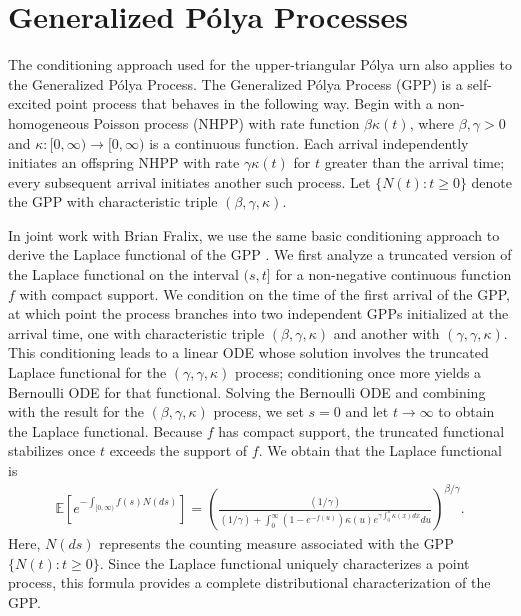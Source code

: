 \documentclass[11pt]{article}
\newenvironment{changemargin}[2]{%
\begin{list}{}{%
\setlength{\topsep}{0pt}%
\setlength{\leftmargin}{#1}%
\setlength{\rightmargin}{#2}%
\setlength{\listparindent}{\parindent}%
\setlength{\itemindent}{\parindent}%
\setlength{\parsep}{\parskip}%
}%
\item[]}{\end{list}}
\begin{document}
\begin{changemargin}{-0.5cm}{-0.5cm}
\section*{Generalized P\'{o}lya Processes}
The conditioning approach used for the upper-triangular Pólya urn also applies to the Generalized Pólya Process. The Generalized P\'{o}lya Process (GPP) is a self-excited point process that behaves in the following way. Begin with a non-homogeneous Poisson process (NHPP) with rate function $\beta \kappa(t)$, where $\beta, \gamma  > 0$ and $\kappa:[0,\infty) \to [0,\infty)$ is a continuous function. Each arrival independently initiates an offspring NHPP with rate $\gamma\kappa(t)$ for $t$ greater than the arrival time; every subsequent arrival initiates another such process.
Let $\{N(t): t \ge 0\}$ denote the GPP with characteristic triple $(\beta, \gamma ,\kappa)$. 

In joint work with Brian Fralix, we use the same basic conditioning approach to derive the Laplace functional of the GPP \cite{PittmanFralix2026GPP}. We first analyze a truncated version of the Laplace functional on the interval $(s,t]$ for a non-negative continuous function $f$ with compact support. We condition on the time of the first arrival of the GPP, at which point the process branches into two independent GPPs initialized at the arrival time, one with characteristic triple $(\beta, \gamma, \kappa)$ and another with $(\gamma, \gamma,\kappa)$.
This conditioning leads to a linear ODE whose solution involves the truncated Laplace functional for the \((\gamma,\gamma,\kappa)\) process; conditioning once more yields a Bernoulli ODE for that functional.
Solving the Bernoulli ODE and combining with the result for the $(\beta, \gamma, \kappa)$ process, we set $s=0$ and let $t\to\infty$ to obtain the Laplace functional. Because $f$ has compact support, the truncated functional stabilizes once $t$ exceeds the support of $f$. We obtain that the Laplace functional is
\begin{align*} \mathbb{E}[e^{-\int_{[0,\infty)}f(s)N(ds)}] = \left(\frac{(1/\gamma)}{(1/\gamma) + \int_{0}^{\infty}(1 - e^{-f(u)})\kappa(u)e^{\gamma \int_0^u \kappa(x)dx}du}\right)^{\beta/\gamma}.\end{align*}
Here, $N(ds)$ represents the counting measure associated with the GPP $\{N(t): t\ge 0\}$. Since the Laplace functional uniquely characterizes a point process, this formula provides a complete distributional characterization of the GPP. 


\end{changemargin}
\end{document}
